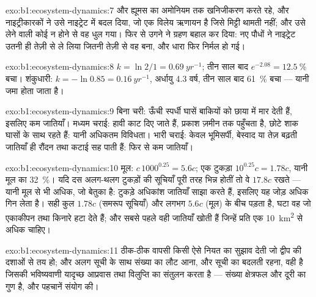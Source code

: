 \begin{solution}{exo:b1:ecosystem-dynamics:7}
  और ह्यूमस का अमोनियम तक खनिजीकरण करते रहे,
और नाइट्रीकारकों ने उसे नाइट्रेट में बदल दिया, जो एक विलेय ऋणायन है जिसे
मिट्टी थामती नहीं; और उसे लेने वाली कोई  न होने से वह धुल गया। फिर से
उगने ने ग्रहण बहाल कर दिया: नए पौधों ने नाइट्रेट उतनी ही तेज़ी से ले लिया
जितनी तेज़ी से वह बना, और धारा फिर निर्मल हो गई।
\end{solution}

\begin{solution}{exo:b1:ecosystem-dynamics:8}
$k = \ln 2/1 = \qty{0.69}{yr^{-1}}$; तीन साल बाद $e^{-2.08} =
\qty{12.5}{\%}$ बचा। शंकुधारी: $k = -\ln 0.85 = \qty{0.16}{yr^{-1}}$,
अर्धायु \num{4.3} वर्ष, तीन साल बाद \qty{61}{\%} बचा --- यानी
 जमा होता जाता है।
\end{solution}

\begin{solution}{exo:b1:ecosystem-dynamics:9}
बिना चरी: ऊँची स्पर्धी घासें बाकियों को छाया में मार देती हैं, इसलिए कम
जातियाँ। मध्यम चराई: हावी काट दिए जाते हैं, प्रकाश
ज़मीन तक पहुँचता है, छोटे शाक घासों के साथ रहते हैं: यानी अधिकतम विविधता।
भारी चराई: केवल भूमिसर्पी, बेस्वाद या तेज़ बढ़ती जातियाँ ही
रौंदन तथा कटाई सह पाती हैं: फिर से कम जातियाँ।
\end{solution}

\begin{solution}{exo:b1:ecosystem-dynamics:10}
मूल: $c\,1000^{0.25} = 5.6c$; एक टुकड़ा $10^{0.25}c = 1.78c$,
यानी मूल का \qty{32}{\%}। यदि दस अलग-थलग टुकड़ों की सूचियाँ पूरी तरह
भिन्न होतीं तो वे $17.8c$ रखते --- यानी मूल से भी अधिक,
जो बेतुका है: टुकड़े अधिकांश जातियाँ साझा करते हैं, इसलिए यह जोड़
अधिक गिन लेता है। सही कुल $1.78c$ (समरूप सूचियाँ) और
लगभग $5.6c$ (मूल) के बीच पड़ता है, घटा वह जो एकाकीपन तथा किनारे
हटा देते हैं; और सबसे पहले वही जातियाँ खोती हैं जिन्हें प्रति एक
\qty{10}{km^2} से अधिक चाहिए।
\end{solution}

\begin{solution}{exo:b1:ecosystem-dynamics:11}
ठीक-ठीक वापसी किसी ऐसे नियत  का सुझाव देती जो द्वीप की
दशाओं से तय हो; और अलग सूची के साथ संख्या का लौट आना,
और सूची का बदलती रहना, वही है जिसकी भविष्यवाणी यादृच्छ
आप्रवास तथा विलुप्ति का संतुलन करता है --- संख्या क्षेत्रफल और दूरी का गुण
है, और पहचानें संयोग की।
\end{solution}

